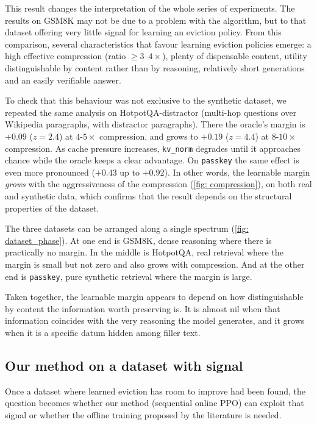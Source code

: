 This result changes the interpretation of the whole series of experiments. The results on GSM8K may not be due to a problem with the algorithm, but to that dataset offering very little signal for learning an eviction policy.
From this comparison, several characteristics that favour learning eviction policies emerge: a high effective compression (ratio $\geq3$--$4\times$), plenty of dispensable content, utility distinguishable by content rather than by reasoning, relatively short generations and an easily verifiable answer.

To check that this behaviour was not exclusive to the synthetic dataset, we repeated the same analysis on HotpotQA-distractor (multi-hop questions over Wikipedia paragraphs, with distractor paragraphs). There the oracle's margin is $+0.09$ ($z=2.4$) at $4$-$5\times$ compression, and grows to $+0.19$ ($z=4.4$) at $8$-$10\times$ compression. As cache pressure increases, \texttt{kv\_norm} degrades until it approaches chance while the oracle keeps a clear advantage. On \texttt{passkey} the same effect is even more pronounced ($+0.43$ up to $+0.92$).
In other words, the learnable margin \emph{grows} with the aggressiveness of the compression (\cref{fig: compression}), on both real and synthetic data, which confirms that the result depends on the structural properties of the dataset.

The three datasets can be arranged along a single spectrum (\cref{fig: dataset_phase}). At one end is GSM8K, dense reasoning where there is practically no margin. In the middle is HotpotQA, real retrieval where the margin is small but not zero and also grows with compression. And at the other end is \texttt{passkey}, pure synthetic retrieval where the margin is large.

Taken together, the learnable margin appears to depend on how distinguishable by content the information worth preserving is. It is almost nil when that information coincides with the very reasoning the model generates, and it grows when it is a specific datum hidden among filler text.

\subsection{Our method on a dataset with signal} \label{subsec: capstone}

Once a dataset where learned eviction has room to improve had been found, the question becomes whether our method (sequential online PPO) can exploit that signal or whether the offline training proposed by the literature is needed.

